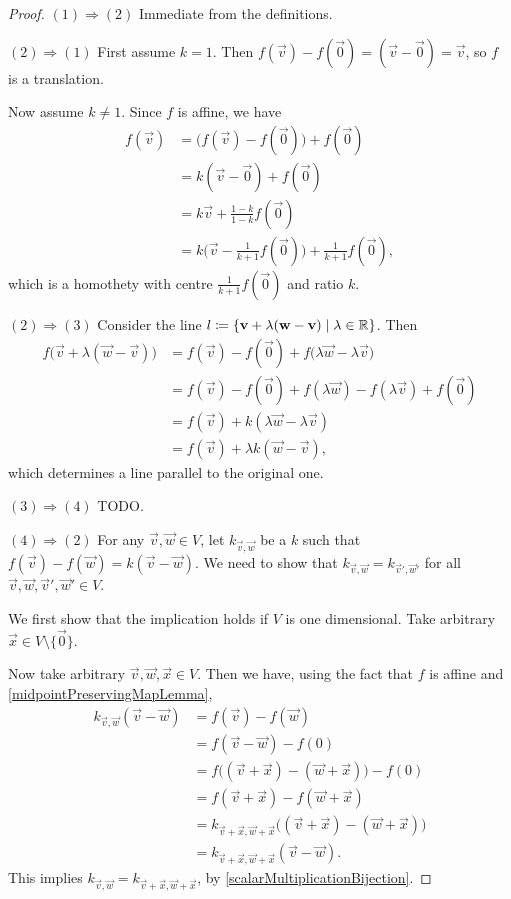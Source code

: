 \begin{proof}
$(1) \Rightarrow (2)$ Immediate from the definitions.

$(2) \Rightarrow (1)$ First assume $k=1$. Then $f(\vec{v})- f(\vec{0}) = (\vec{v}-\vec{0}) = \vec{v}$, so $f$ is a translation.

Now assume $k\neq 1$. Since $f$ is affine, we have
\begin{align*}
f(\vec{v}) &= \big(f(\vec{v}) - f(\vec{0})\big) + f(\vec{0}) \\
&= k(\vec{v}-\vec{0})+ f(\vec{0}) \\
&= k \vec{v} + \frac{1-k}{1-k}f(\vec{0}) \\
&= k\Big(\vec{v}-\frac{1}{k+1}f(\vec{0})\Big) + \frac{1}{k+1}f(\vec{0}),
\end{align*}
which is a homothety with centre $\frac{1}{k+1}f(\vec{0})$ and ratio $k$.

$(2) \Rightarrow (3)$ Consider the line $l \defeq \setbuilder{\vec{v} + \lambda (\vec{w}-\vec{v})}{\lambda\in \R}$. Then
\begin{align*}
f\big(\vec{v} + \lambda (\vec{w}-\vec{v})\big) &= f(\vec{v}) - f(\vec{0}) + f\big(\lambda \vec{w} - \lambda \vec{v}\big) \\
&= f(\vec{v}) - f(\vec{0}) + f(\lambda \vec{w}) - f(\lambda \vec{v}) + f(\vec{0}) \\
&= f(\vec{v})  + k(\lambda \vec{w} - \lambda \vec{v}) \\
&= f(\vec{v})  + \lambda k(\vec{w} - \vec{v}),
\end{align*}
which determines a line parallel to the original one.

$(3) \Rightarrow (4)$ TODO.

$(4) \Rightarrow (2)$ For any $\vec{v},\vec{w}\in V$, let $k_{\vec{v}, \vec{w}}$ be a $k$ such that $f(\vec{v}) - f(\vec{w}) = k(\vec{v}-\vec{w})$. We need to show that $k_{\vec{v}, \vec{w}} = k_{\vec{v}', \vec{w}'}$ for all $\vec{v},\vec{w},\vec{v}',\vec{w}'\in V$.

We first show that the implication holds if $V$ is one dimensional. Take arbitrary $\vec{x}\in V\setminus\{\vec{0}\}$.

Now take arbitrary $\vec{v},\vec{w},\vec{x}\in V$. Then we have, using the fact that $f$ is affine and \ref{midpointPreservingMapLemma},
\begin{align*}
k_{\vec{v},\vec{w}}(\vec{v} - \vec{w}) &= f(\vec{v}) - f(\vec{w}) \\
&= f(\vec{v} - \vec{w}) - f(0)  \\
&= f\big((\vec{v} + \vec{x}) - (\vec{w} + \vec{x})\big) - f(0)  \\
&= f(\vec{v}+ \vec{x}) - f(\vec{w} + \vec{x})  \\
&= k_{\vec{v}+\vec{x},\vec{w}+\vec{x}}\big((\vec{v}+ \vec{x}) - (\vec{w}+ \vec{x})\big)  \\
&= k_{\vec{v}+\vec{x},\vec{w}+\vec{x}}(\vec{v} - \vec{w}).
\end{align*}
This implies $k_{\vec{v},\vec{w}} = k_{\vec{v}+\vec{x},\vec{w}+\vec{x}}$, by \ref{scalarMultiplicationBijection}.


\end{proof}
